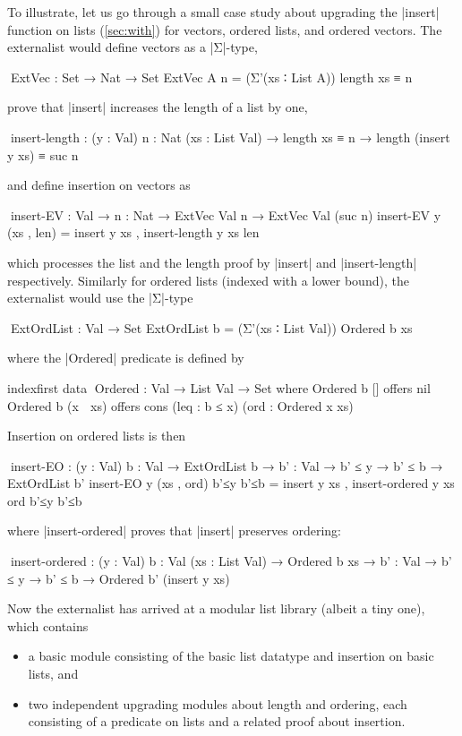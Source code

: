 To illustrate, let us go through a small case study about upgrading the |insert| function on lists (\autoref{sec:with}) for vectors, ordered lists, and ordered vectors.
The externalist would define vectors as a |Σ|-type,
\begin{code}
^^^ExtVec : Set → Nat → Set
ExtVec A n = (Σ'(xs ∶ List A)) length xs ≡ n
\end{code}
prove that |insert| increases the length of a list by one,
\begin{code}
^^^insert-length :  (y : Val) {n : Nat} (xs : List Val) →
                    length xs ≡ n → length (insert y xs) ≡ suc n
\end{code}
and define insertion on vectors as
\begin{code}
^^^insert-EV : Val → {n : Nat} → ExtVec Val n → ExtVec Val (suc n)
insert-EV y (xs , len) = insert y xs , insert-length y xs len
\end{code}
which processes the list and the length proof by |insert| and |insert-length| respectively.
Similarly for ordered lists (indexed with a lower bound), the externalist would use the |Σ|-type
\begin{code}
^^^ExtOrdList : Val → Set
ExtOrdList b = (Σ'(xs ∶ List Val)) Ordered b xs
\end{code}
where the |Ordered| predicate is defined by
\begin{code}
indexfirst data ^^^Ordered : Val → List Val → Set where
  Ordered b []        offers nil
  Ordered b (x ∷ xs)  offers cons (leq : b ≤ x) (ord : Ordered x xs)
\end{code}
Insertion on ordered lists is then
\begin{code}
^^^insert-EO :  (y : Val) {b : Val} → ExtOrdList b →
                {b' : Val} → b' ≤ y → b' ≤ b → ExtOrdList b'
insert-EO y (xs , ord) b'≤y b'≤b = insert y xs , insert-ordered y xs ord b'≤y b'≤b
\end{code}
where |insert-ordered| proves that |insert| preserves ordering:
\begin{code}
^^^insert-ordered :  (y : Val) {b : Val} (xs : List Val) → Ordered b xs →
                     {b' : Val} → b' ≤ y → b' ≤ b → Ordered b' (insert y xs)
\end{code}
Now the externalist has arrived at a modular list library (albeit a tiny one), which contains
\begin{itemize}
\item a basic module consisting of the basic list datatype and insertion on basic lists, and
\item two independent upgrading modules about length and ordering, each consisting of a predicate on lists and a related proof about insertion.
\end{itemize}
